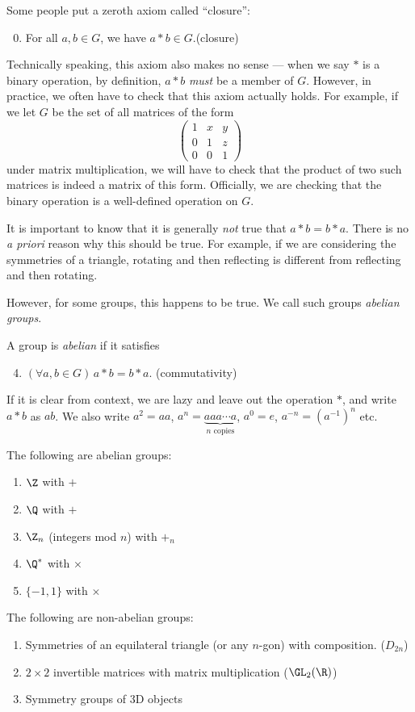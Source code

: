 \documentclass[a4paper]{article}
\begin{document}
Some people put a zeroth axiom called ``closure'':
\begin{enumerate}[label=\arabic{*}.]
    \setcounter{enumi}{-1}
  \item For all $a, b \in G$, we have $a * b \in G$.\hfill (closure)
\end{enumerate}
Technically speaking, this axiom also makes no sense --- when we say $*$ is a binary operation, by definition, $a * b$ \emph{must} be a member of $G$. However, in practice, we often have to check that this axiom actually holds. For example, if we let $G$ be the set of all matrices of the form
\[
  \begin{pmatrix}
    1 & x & y\\
    0 & 1 & z\\
    0 & 0 & 1
  \end{pmatrix}
\]
under matrix multiplication, we will have to check that the product of two such matrices is indeed a matrix of this form. Officially, we are checking that the binary operation is a well-defined operation on $G$.

It is important to know that it is generally \emph{not} true that $a*b = b*a$. There is no \emph{a priori} reason why this should be true. For example, if we are considering the symmetries of a triangle, rotating and then reflecting is different from reflecting and then rotating.

However, for some groups, this happens to be true. We call such groups \emph{abelian groups}.
\begin{defi}
  A group is \emph{abelian} if it satisfies
  \begin{enumerate}[label=\arabic{*}.]
      \setcounter{enumi}{3}
    \item $(\forall a, b \in G)\, a*b = b*a$. \hfill (commutativity)
  \end{enumerate}
\end{defi}
If it is clear from context, we are lazy and leave out the operation $*$, and write $a*b$ as $ab$. We also write $a^2 = aa$, $a^n = \underbrace{aaa\cdots a}_{n \text{ copies}}$, $a^0 = e$, $a^{-n} = (a^{-1})^n$ etc.
\begin{eg}
  The following are abelian groups:
  \begin{enumerate}
    \item $\Z$ with $+$
    \item $\Q$ with $+$
    \item $\Z_n$ (integers mod $n$) with $+_n$
    \item $\Q^*$ with $\times$
    \item $\{-1, 1\}$ with $\times$
  \end{enumerate}
  The following are non-abelian groups:
  \begin{enumerate}[resume]
    \item Symmetries of an equilateral triangle (or any $n$-gon) with composition. ($D_{2n}$)
    \item $2\times 2$ invertible matrices with matrix multiplication ($\GL_2(\R)$)
    \item Symmetry groups of 3D objects
  \end{enumerate}
\end{eg}
\end{document}
